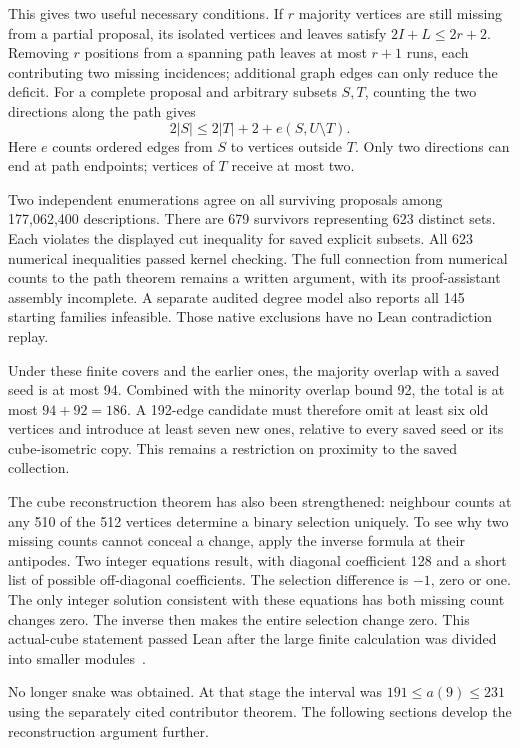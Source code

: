 \documentclass[11pt,a4paper]{article}
\begin{document}
This gives two useful necessary conditions. If $r$ majority vertices are
still missing from a partial proposal, its isolated vertices and leaves
satisfy $2I+L\le2r+2$. Removing $r$ positions from a spanning path leaves
at most $r+1$ runs, each contributing two missing incidences; additional
graph edges can only reduce the deficit. For a complete proposal and
arbitrary subsets $S,T$, counting the two directions along the path gives
\[
2|S|\le2|T|+2+e(S,U\setminus T).
\]
Here $e$ counts ordered edges from $S$ to vertices outside $T$. Only two
directions can end at path endpoints; vertices of $T$ receive at most two.

Two independent enumerations agree on all surviving proposals among
177,062,400 descriptions. There are 679 survivors representing 623
distinct sets. Each violates the displayed cut inequality for saved
explicit subsets. All 623 numerical inequalities passed kernel checking.
The full connection from numerical counts to the path theorem remains
a written argument, with its proof-assistant assembly incomplete. A
separate audited degree model also reports all 145 starting families
infeasible. Those native exclusions have no Lean contradiction replay.

Under these finite covers and the earlier ones, the majority overlap
with a saved seed is at most 94. Combined with the minority overlap
bound 92, the total is at most $94+92=186$.
A 192-edge candidate must therefore omit at least six old vertices and
introduce at least seven new ones, relative to every saved seed or its
cube-isometric copy. This remains a restriction on proximity to the
saved collection.

The cube reconstruction theorem has also been strengthened: neighbour
counts at any 510 of the 512 vertices determine a binary selection
uniquely. To see why two missing counts cannot conceal a change, apply
the inverse formula at their antipodes. Two integer equations result,
with diagonal coefficient 128 and a short list of possible off-diagonal
coefficients. The selection difference is $-1$, zero or one. The only
integer solution consistent with these equations has both missing
count changes zero. The inverse then makes the entire selection change
zero. This actual-cube statement passed Lean after the large finite
calculation was divided into smaller modules~\cite{research237}.

No longer snake was obtained. At that stage the interval was $191\le a(9)\le231$
using the separately cited contributor theorem. The following sections develop the reconstruction argument further.
\end{document}
